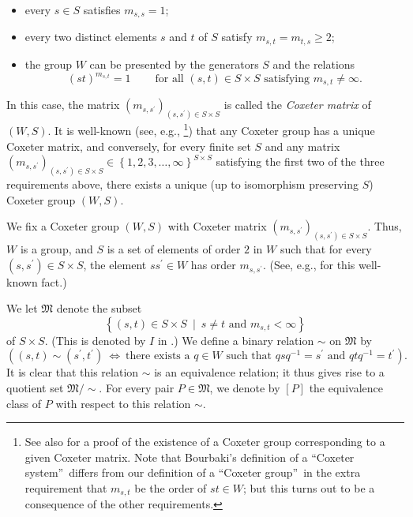 \documentclass
[numbers=enddot,12pt,final,onecolumn,notitlepage,abstracton]{scrartcl}%
\theoremstyle{definition}
\begin{document}
\begin{itemize}
\item every $s\in S$ satisfies $m_{s,s}=1$;

\item every two distinct elements $s$ and $t$ of $S$ satisfy $m_{s,t}%
=m_{t,s}\geq2$;

\item the group $W$ can be presented by the generators $S$ and the relations
\[
\left(  st\right)  ^{m_{s,t}}=1\ \ \ \ \ \ \ \ \ \ \text{for all }\left(
s,t\right)  \in S\times S\text{ satisfying }m_{s,t}\neq\infty.
\]

\end{itemize}

In this case, the matrix $\left(  m_{s,s^{\prime}}\right)  _{\left(
s,s^{\prime}\right)  \in S\times S}$ is called the \emph{Coxeter matrix} of
$\left(  W,S\right)  $. It is well-known (see, e.g., \cite[\S 1]%
{Lusztig-Hecke}\footnote{See also \cite[Chapter V, n$^{\circ}$ 4.3,
Corollaire]{Bourbaki4-6} for a proof of the existence of a Coxeter group
corresponding to a given Coxeter matrix. Note that Bourbaki's definition of a
\textquotedblleft Coxeter system\textquotedblright\ differs from our
definition of a \textquotedblleft Coxeter group\textquotedblright\ in the
extra requirement that $m_{s,t}$ be the order of $st\in W$; but this turns out
to be a consequence of the other requirements.}) that any Coxeter group has a
unique Coxeter matrix, and conversely, for every finite set $S$ and any matrix
$\left(  m_{s,s^{\prime}}\right)  _{\left(  s,s^{\prime}\right)  \in S\times
S}\in\left\{  1,2,3,\ldots,\infty\right\}  ^{S\times S}$ satisfying the first
two of the three requirements above, there exists a unique (up to isomorphism
preserving $S$) Coxeter group $\left(  W,S\right)  $.

We fix a Coxeter group $\left(  W,S\right)  $ with Coxeter matrix $\left(
m_{s,s^{\prime}}\right)  _{\left(  s,s^{\prime}\right)  \in S\times S}$. Thus,
$W$ is a group, and $S$ is a set of elements of order $2$ in $W$ such that for
every $\left(  s,s^{\prime}\right)  \in S\times S$, the element $ss^{\prime
}\in W$ has order $m_{s,s^{\prime}}$. (See, e.g., \cite[Proposition
1.3(b)]{Lusztig-Hecke} for this well-known fact.)

We let $\mathfrak{M}$ denote the subset%
\[
\left\{  \left(  s,t\right)  \in S\times S\ \mid\ s\neq t\text{ and }%
m_{s,t}<\infty\right\}
\]
of $S\times S$. (This is denoted by $I$ in \cite[Chapter 4, n$^{\circ}$
1.3]{Bourbaki4-6}.) We define a binary relation $\sim$ on $\mathfrak{M}$ by%
\[
\left(  \left(  s,t\right)  \sim\left(  s^{\prime},t^{\prime}\right)
\ \Longleftrightarrow\ \text{there exists a }q\in W\text{ such that }%
qsq^{-1}=s^{\prime}\text{ and }qtq^{-1}=t^{\prime}\right)  .
\]
It is clear that this relation $\sim$ is an equivalence relation; it thus
gives rise to a quotient set $\mathfrak{M}/\sim$. For every pair
$P\in\mathfrak{M}$, we denote by $\left[  P\right]  $ the equivalence class of
$P$ with respect to this relation $\sim$.
\end{document}
